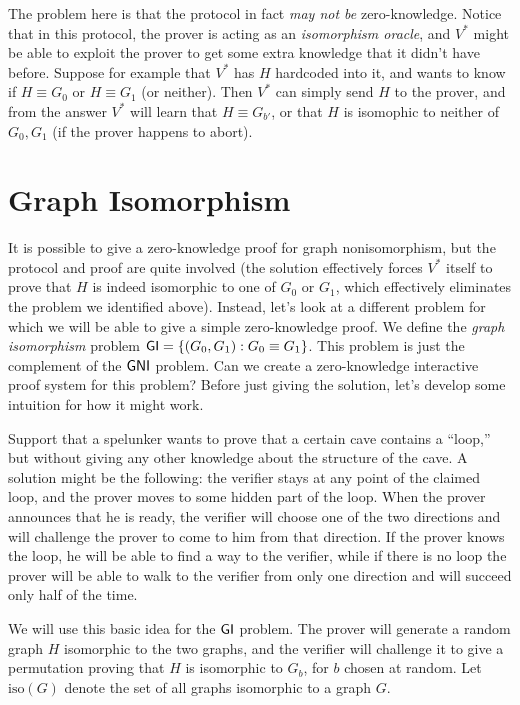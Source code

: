 \documentclass[11pt]{article}
\begin{document}
The problem here is that the protocol in fact \emph{may not be}
zero-knowledge.  Notice that in this protocol, the prover is acting as
an \emph{isomorphism oracle}, and $V^*$ might be able to exploit the
prover to get some extra knowledge that it didn't have before.
Suppose for example that $V^*$ has $H$ hardcoded into it, and wants to
know if $H \equiv G_0$ or $H \equiv G_1$ (or neither).  Then $V^*$ can
simply send $H$ to the prover, and from the answer $V^*$ will learn
that $H\equiv G_{b'}$, or that $H$ is isomophic to neither of $G_0,
G_1$ (if the prover happens to abort).

\section{Graph Isomorphism}
\label{sec:graph-isomorphism}

\newcommand{\gi}{\problem{GI}}
\newcommand{\iso}{\text{iso}}

It is possible to give a zero-knowledge proof for graph
nonisomorphism, but the protocol and proof are quite involved (the
solution effectively forces $V^{*}$ itself to prove that $H$ is indeed
isomorphic to one of $G_{0}$ or $G_{1}$, which effectively eliminates
the problem we identified above).  Instead, let's look at a different
problem for which we will be able to give a simple zero-knowledge
proof.  We define the \emph{graph isomorphism} problem $\gi =
\set{(G_{0}, G_{1}) : G_{0} \equiv G_{1}}$.  This problem is just the
complement of the $\mathsf{GNI}$ problem.  Can we create a zero-knowledge
interactive proof system for this problem?  Before just giving the
solution, let's develop some intuition for how it might work.

Support that a spelunker wants to prove that a certain cave contains a
``loop,'' but without giving any other knowledge about the structure
of the cave.  A solution might be the following: the verifier stays at
any point of the claimed loop, and the prover moves to some hidden
part of the loop.  When the prover announces that he is ready, the
verifier will choose one of the two directions and will challenge the
prover to come to him from that direction.  If the prover knows the
loop, he will be able to find a way to the verifier, while if there is
no loop the prover will be able to walk to the verifier from only one
direction and will succeed only half of the time.

We will use this basic idea for the $\gi$ problem.  The prover will
generate a random graph $H$ isomorphic to the two graphs, and the
verifier will challenge it to give a permutation proving that $H$ is
isomorphic to $G_b$, for $b$ chosen at random.  Let $\iso(G)$ denote
the set of all graphs isomorphic to a graph $G$.
\end{document}
